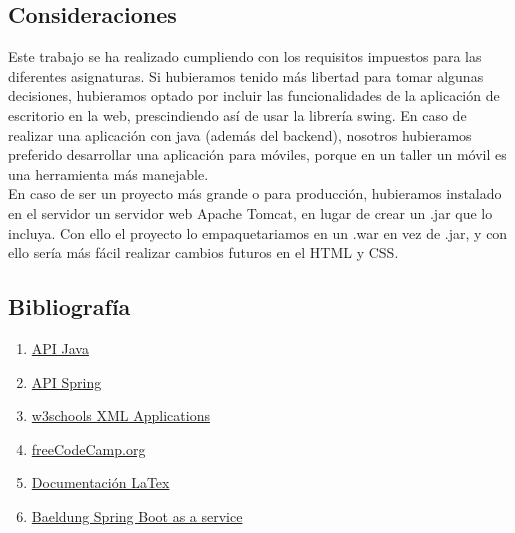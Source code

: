 \documentclass{article}
\begin{document}
\subsection{Consideraciones}  
Este trabajo se ha realizado cumpliendo con los requisitos impuestos para las diferentes asignaturas. Si hubieramos tenido más libertad para tomar algunas decisiones, hubieramos optado por incluir las funcionalidades
de la aplicación de escritorio en la web, prescindiendo así de usar la librería swing. En caso de realizar una aplicación con java (además del backend), nosotros hubieramos preferido desarrollar una aplicación para móviles, porque en un taller un móvil es una herramienta
más manejable. \\ 
En caso de ser un proyecto más grande o para producción, hubieramos instalado en el servidor un servidor web Apache Tomcat, en lugar de crear un .jar que lo incluya. Con ello el proyecto lo empaquetariamos en un .war en vez de .jar,
y con ello sería más fácil realizar cambios futuros en el HTML y CSS.
\subsection{Bibliografía}
\begin{enumerate}
  \item \href{https://docs.oracle.com/en/java/javase/18/docs/api/index.html}{API Java}
  \item \href{https://docs.spring.io/spring-framework/docs/current/javadoc-api/}{API Spring}
  \item \href{https://www.w3schools.com/xml/ajax_applications.asp}{w3schools XML Applications}
  \item \href{https://www.youtube.com/watch?v=vtPkZShrvXQ}{freeCodeCamp.org}
  \item \href{https://es.overleaf.com/learn}{Documentación LaTex}
  \item \href{https://www.baeldung.com/spring-boot-app-as-a-service}{Baeldung Spring Boot as a service}
\end{enumerate}
\end{document}
